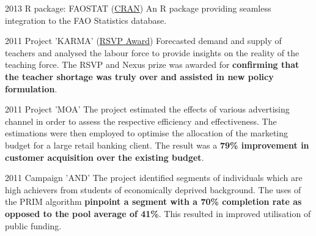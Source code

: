 \documentclass{tccv}
\begin{document}
\begin{yearlist}

\item{2013}
     {R package: FAOSTAT
       (\href{http://cran.r-project.org/web/packages/FAOSTAT/index.html}{CRAN})}
     {An R package providing seamless integration to the FAO
       Statistics database.}

\item{2011} {Project 'KARMA'
  (\href{http://nzdmawards.co.nz/winners-archive/2011-winners-gallery/ministry-of-education-what-teacher-shortage}{RSVP
    Award})} {Forecasted demand and supply of teachers and analysed
  the labour force to provide insights on the reality of the teaching
  force. The RSVP and Nexus prize was awarded for \textbf{confirming
    that the teacher shortage was truly over and assisted in new
    policy formulation}.}

\end{yearlist}
  
\begin{yearlist}
    
\item{2011} {Project 'MOA'} {The project estimated the effects of
  various advertising channel in order to assess the respective
  efficiency and effectiveness. The estimations were then employed to
  optimise the allocation of the marketing budget for a large retail
  banking client. The result was a \textbf{79\% improvement in
    customer acquisition over the existing budget}.}


\item{2011}
     {Campaign 'AND'}
     {The project identified segments of individuals which are high
       achievers from students of economically deprived
       background. The uses of the PRIM algorithm \textbf{pinpoint a
         segment with a 70\% completion rate as opposed to the pool
         average of 41\%}. This resulted in improved utilisation of
       public funding.}

\end{yearlist}

\end{document}
